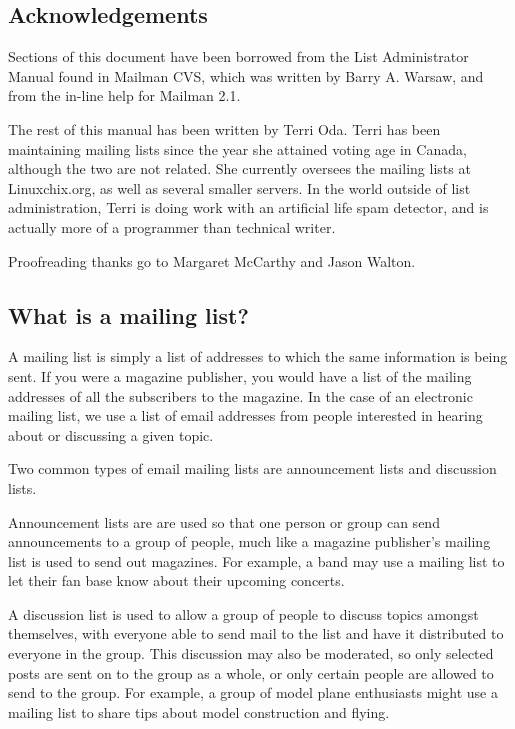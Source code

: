 \documentclass{howto}
\begin{document}
\subsection{Acknowledgements}

Sections of this document have been borrowed from the List Administrator Manual
found in Mailman CVS, which was written by Barry A. Warsaw, and from the in-line
help for Mailman 2.1.  

The rest of this manual has been written by Terri Oda.
Terri has been maintaining mailing lists since the year she attained 
voting age in Canada, although the two are not related.  She currently 
oversees the mailing lists at Linuxchix.org, as well as several smaller 
servers.  In the world outside of list administration, Terri is doing 
work with an artificial life spam detector, and is actually more of a 
programmer than technical writer.

Proofreading thanks go to Margaret McCarthy and Jason Walton.


\subsection{What is a mailing list?}

A mailing list is simply a list of addresses to which the same information
is being sent.  If you were a magazine publisher, you would have a list of
the mailing addresses of all the subscribers to the magazine.  In the case
of an electronic mailing list, we use a list of email addresses from people
interested in hearing about or discussing a given topic.  

Two common types of email mailing lists are announcement lists and discussion 
lists.  

Announcement lists are are used so that one person or group can send
announcements to a group of people, much like a magazine publisher's mailing
list is used to send out magazines.  For example, a band may use a mailing list
to let their fan base know about their upcoming concerts.


A discussion list is used to allow a group of people to discuss topics amongst
themselves, with everyone able to send mail to the list and have it distributed
to everyone in the group.  This discussion may also be moderated, so only
selected posts are sent on to the group as a whole, or only certain people are
allowed to send to the group.  For example, a group of model plane enthusiasts
might use a mailing list to share tips about model construction and flying.
\end{document}
